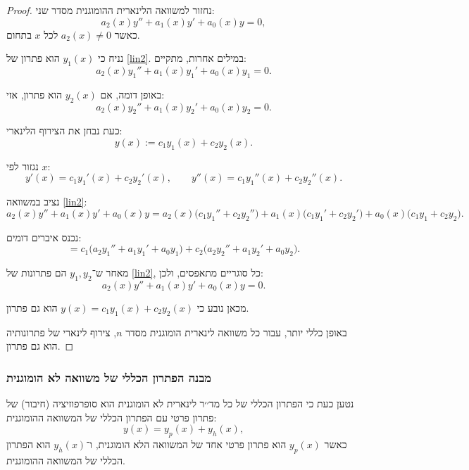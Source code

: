 \documentclass{article}
\numberwithin{equation}{section}
\begin{document}
\begin{proof}
נחזור למשוואה הלינארית ההומוגנית מסדר שני:
\begin{equation}\label{lin2}
a_2(x)y'' + a_1(x)y' + a_0(x)y = 0,
\end{equation}
כאשר $a_2(x)\neq 0$ לכל $x$ בתחום.

נניח כי $y_1(x)$ הוא פתרון של \eqref{lin2}.  
במילים אחרות, מתקיים:
\[
a_2(x)y_1'' + a_1(x)y_1' + a_0(x)y_1 = 0.
\]

באופן דומה, אם $y_2(x)$ הוא פתרון, אזי:
\[
a_2(x)y_2'' + a_1(x)y_2' + a_0(x)y_2 = 0.
\]

כעת נבחן את הצירוף הלינארי:
\[
y(x) := c_1 y_1(x) + c_2 y_2(x).
\]

נגזור לפי $x$:
\[
y'(x) = c_1 y_1'(x) + c_2 y_2'(x), 
\qquad
y''(x) = c_1 y_1''(x) + c_2 y_2''(x).
\]

נציב במשוואה \eqref{lin2}:
\[
a_2(x)y'' + a_1(x)y' + a_0(x)y 
= a_2(x)\big(c_1 y_1'' + c_2 y_2''\big) 
+ a_1(x)\big(c_1 y_1' + c_2 y_2'\big) 
+ a_0(x)\big(c_1 y_1 + c_2 y_2\big).
\]

נכנס איברים דומים:
\[
= c_1 \big(a_2 y_1'' + a_1 y_1' + a_0 y_1\big) 
+ c_2 \big(a_2 y_2'' + a_1 y_2' + a_0 y_2\big).
\]

מאחר ש־$y_1,y_2$ הם פתרונות של \eqref{lin2}, כל סוגריים מתאפסים, ולכן:
\[
a_2(x)y'' + a_1(x)y' + a_0(x)y = 0.
\]

מכאן נובע כי $y(x)=c_1y_1(x)+c_2y_2(x)$ הוא גם פתרון.  

באופן כללי יותר, עבור כל משוואה לינארית הומוגנית מסדר $n$, צירוף לינארי של פתרונותיה הוא גם פתרון.  
\end{proof}

\subsubsection{מבנה הפתרון הכללי של משוואה לא הומוגנית}

נטען כעת כי הפתרון הכללי של כל מד׳׳ר לינארית לא הומוגנית הוא סופרפוזיציה (חיבור) של פתרון פרטי עם הפתרון הכללי של המשוואה ההומוגנית:
\begin{equation}
y(x) = y_p(x) + y_h(x),
\end{equation}
כאשר $y_p(x)$ הוא פתרון פרטי אחד של המשוואה הלא הומוגנית, ו־$y_h(x)$ הוא הפתרון הכללי של המשוואה ההומוגנית.
\end{document}
